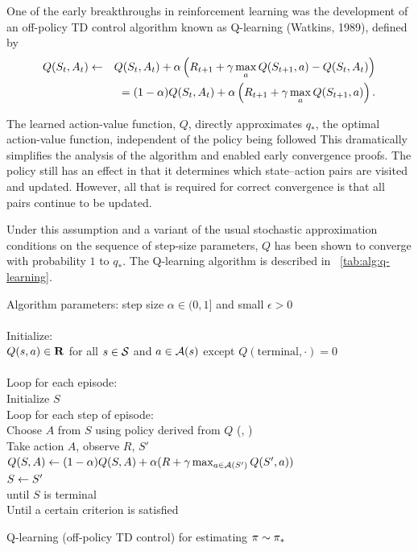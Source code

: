 One of the early breakthroughs in reinforcement learning was
the development of an off-policy TD control algorithm known as Q-learning (Watkins, 1989),
defined by
\begin{eqnarray}
\nonumber
Q(S_{t}, A_t) &\leftarrow&
Q(S_{t}, A_t) + \alpha \left(
R_{t+1}
+ \gamma \max_{a} Q(S_{t+1},a) - Q(S_{t},A_t)
\right)
\\&&
=
(1-\alpha) Q(S_{t}, A_t) + \alpha \left(
R_{t+1}
+ \gamma \max_{a} Q(S_{t+1},a)
\right).
\end{eqnarray}


The learned action-value function, $Q$, directly approximates $q_\ast$,
the optimal action-value function, independent of the policy being followed
This dramatically simplifies the analysis of the algorithm and enabled early convergence proofs.
The policy still has an effect in that it determines which state–action pairs are visited and updated.
However, all that is required for correct convergence is that all pairs continue to be updated.

Under this assumption and a variant of the usual stochastic approximation conditions
on the sequence of step-size parameters,
$Q$ has been shown to converge with probability $1$ to $q_\ast$.
The Q-learning algorithm is described in \tablename~\ref{tab:alg:q-learning}.



\begin{table}
\beginalg
Algorithm parameters: step size $\alpha \in (0, 1]$ and small $\epsilon>0$\\
\\
Initialize:\\
\> $Q(s,a) \in \mathbf{R}$ for all $s\in\mathcal{S}$ and $a\in\mathcal{A}(s)$
    except $Q(\mathrm{terminal}, \cdot)=0$\\
\\
Loop for each episode:\\
\> Initialize $S$\\
\> Loop for each step of episode:\\
\> \> Choose $A$ from $S$ using policy derived from $Q$ (\eg, \epsgreedy)\\
\> \> Take action $A$, observe $R$, $S'$\\
\> \> $Q(S,A) \leftarrow (1-\alpha) Q(S,A) + \alpha (R + \gamma \max_{a\in\mathcal{A}(S')}Q(S',a))$\\
\> \> $S \leftarrow S'$\\
\> until $S$ is terminal\\
Until a certain criterion is satisfied
\endalg
\caption{Q-learning (off-policy TD control) for estimating $\pi \sim {\ensuremath{\pi}}_\ast$}
\label{tab:alg:q-learning}
\end{table}


